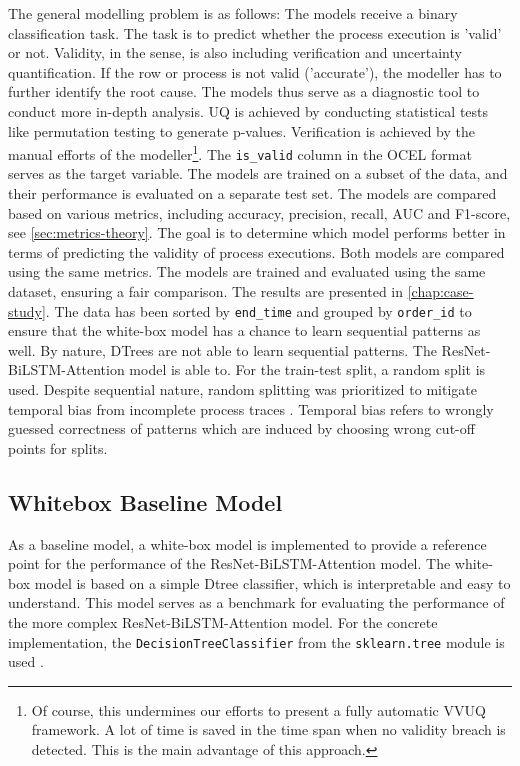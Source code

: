 The general modelling problem is as follows: The models receive a binary classification task. The task is to predict whether the process execution is 'valid' or not. Validity, in the sense, is also including verification and uncertainty quantification. If the row or process is not valid ('accurate'), the modeller has to further identify the root cause. The models thus serve as a diagnostic tool to conduct more in-depth analysis. UQ is achieved by conducting statistical tests like permutation testing to generate p-values. Verification is achieved by the manual efforts of the modeller\footnote{Of course, this undermines our efforts to present a fully automatic VVUQ framework. A lot of time is saved in the time span when no validity breach is detected. This is the main advantage of this approach.}. The \texttt{is\_valid} column in the OCEL format serves as the target variable. The models are trained on a subset of the data, and their performance is evaluated on a separate test set. The models are compared based on various metrics, including accuracy, precision, recall, AUC and F1-score, see \autoref{sec:metrics-theory}. The goal is to determine which model performs better in terms of predicting the validity of process executions. Both models are compared using the same metrics. The models are trained and evaluated using the same dataset, ensuring a fair comparison. The results are presented in \autoref{chap:case-study}. The data has been sorted by \texttt{end\_time} and grouped by \texttt{order\_id} to ensure that the white-box model has a chance to learn sequential patterns as well. By nature, DTrees are not able to learn sequential patterns. The ResNet-BiLSTM-Attention model is able to. For the train-test split, a random split is used. Despite sequential nature, random splitting was prioritized to mitigate temporal bias from incomplete process traces \autocite{morita2022investigation}. Temporal bias refers to wrongly guessed correctness of patterns which are induced by choosing wrong cut-off points for splits.


\subsection{Whitebox Baseline Model}
As a baseline model, a white-box model is implemented to provide a reference point for the performance of the ResNet-BiLSTM-Attention model. The white-box model is based on a simple Dtree classifier, which is interpretable and easy to understand. This model serves as a benchmark for evaluating the performance of the more complex ResNet-BiLSTM-Attention model. For the concrete implementation, the \texttt{DecisionTreeClassifier} from the \texttt{sklearn.tree} module is used \autocite{Scikit-Learn}.

